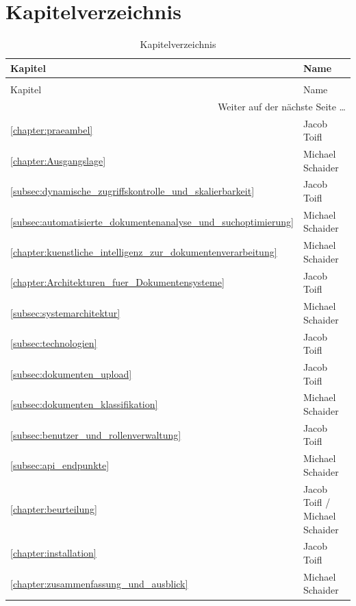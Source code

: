 \section{Kapitelverzeichnis}
\begin{longtable}{p{}|p{}}
 \\
Kapitel & Name  \\
\cline{1-2}
\endfirsthead%
\caption{Kapitelverzeichnis Fortsetzung}\\
Kapitel & Name \\
\cline{1-2}
\endhead%
\multicolumn{2}{r}{Weiter auf der nächste Seite \ldots }\\
\endfoot%
\cline{1-2}
\caption{Kapitelverzeichnis}
\endlastfoot%
\ref{chapter:praeambel} & Jacob Toifl \\
\ref{chapter:Ausgangslage} & Michael Schaider \\
\ref{subsec:dynamische_zugriffskontrolle_und_skalierbarkeit} & Jacob Toifl \\
\ref{subsec:automatisierte_dokumentenanalyse_und_suchoptimierung} & Michael Schaider \\
\ref{chapter:kuenstliche_intelligenz_zur_dokumentenverarbeitung} & Michael Schaider \\
\ref{chapter:Architekturen_fuer_Dokumentensysteme} & Jacob Toifl \\
\ref{subsec:systemarchitektur} & Michael Schaider \\
\ref{subsec:technologien} & Jacob Toifl \\
\ref{subsec:dokumenten_upload} & Jacob Toifl \\
\ref{subsec:dokumenten_klassifikation} & Michael Schaider \\
\ref{subsec:benutzer_und_rollenverwaltung} & Jacob Toifl \\
\ref{subsec:api_endpunkte} & Michael Schaider \\
\ref{chapter:beurteilung} & Jacob Toifl / Michael Schaider \\
\ref{chapter:installation} & Jacob Toifl \\
\ref{chapter:zusammenfassung_und_ausblick} & Michael Schaider \\
\end{longtable}